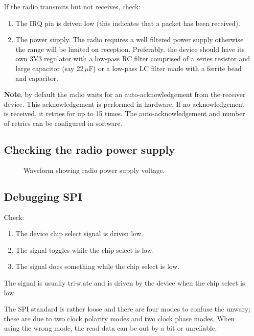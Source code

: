 If the radio transmits but not receives, check:

\begin{enumerate}
\item
  The IRQ pin is driven low (this indicates that a packet has been
  received).
\item
  The power supply. The radio requires a well filtered power supply
  otherwise the range will be limited on reception. Preferably, the
  device should have its own 3V3 regulator with a low-pass RC filter
  comprised of a series resistor and large capacitor (say 22\,$\mu$F)
  or a low-pass LC filter made with a ferrite bead and capacitor.
\end{enumerate}

\textbf{Note}, by default the radio waits for an auto-acknowledgement
from the receiver device. This acknowledgement is performed in hardware.
If no acknowledgement is received, it retries for up to 15 times. The
auto-acknowledgement and number of retries can be configured in
software.

\subsection{Checking the radio power supply}
\label{checking-the-radio-power-supply}

\begin{figure}[!h]
  \centering
  \caption{Waveform showing radio power supply voltage.}
\end{figure}


\subsection{Debugging SPI}
\label{debugging-spi}

Check:
%
\begin{enumerate}
\item The device chip select signal is driven low.
\item The  signal toggles while the chip select is low.
\item The  signal does something while the chip select is low.
\end{enumerate}
%
The  signal is usually tri-state and is driven by the
device when the chip select is low.

The SPI standard is rather loose and there are four modes to confuse
the unwary; these are due to two clock polarity modes and two clock
phase modes.  When using the wrong mode, the read data can be out by a
bit or unreliable.

